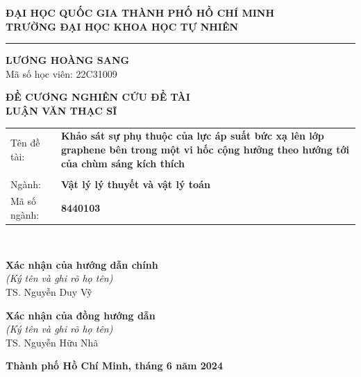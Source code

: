 \documentclass[a4paper]{elsarticle}
\begin{document}
\onehalfspacing
\fontsize{12}{15.6}\selectfont
\begin{titlepage}
		\begin{center}
\textbf{ĐẠI HỌC QUỐC GIA THÀNH PHỐ HỒ CHÍ MINH}\\
\textbf{TRƯỜNG ĐẠI HỌC KHOA HỌC TỰ NHIÊN}\\
	\noindent\rule{4cm}{0.4pt}
\end{center}
\vspace{10pt}
\fontsize{13}{15.6}\selectfont
\begin{center}
	\textbf{LƯƠNG HOÀNG SANG}\\
	Mã số học viên: 22C31009
\end{center}
\fontsize{16pt}{15.6pt}\selectfont
\vspace{20pt}
\begin{center}
	\textbf{ĐỀ CƯƠNG NGHIÊN CỨU ĐỀ TÀI\\ LUẬN VĂN THẠC SĨ
	}
\end{center}

\vspace{20pt}
\fontsize{12}{15.6}\selectfont
\begin{tabular}{p{3cm}p{11cm}}
	Tên đề tài: & \textbf{Khảo sát sự phụ thuộc của lực áp suất bức xạ lên lớp graphene bên trong một vi hốc cộng hưởng theo hướng tới của chùm sáng kích thích}\\
	&\\
	Ngành: & \textbf{Vật lý lý thuyết và vật lý toán}\\
	Mã số ngành: &\textbf{8440103}
\end{tabular}
\vspace{2cm}\\
\begin{minipage}{0.5\textwidth}
\begin{center}
	\textbf{Xác nhận của hướng dẫn chính}\\
	\textit{(Ký tên và ghi rõ họ tên)}\\
	\vspace{2.5cm}
	TS. Nguyễn Duy Vỹ
\end{center}
\end{minipage}
\hfill
\begin{minipage}{0.5\textwidth}
	\begin{center}
		\textbf{Xác nhận của đồng hướng dẫn}\\
		\textit{(Ký tên và ghi rõ họ tên)}\\
		\vspace{2.5cm}
		TS. Nguyễn Hữu Nhã
	\end{center}
\end{minipage}


\vspace{1cm}

\begin{center}
	\textbf{Thành phố Hồ Chí Minh, tháng 6 năm 2024}
\end{center}
\end{titlepage}
\newpage
\fontsize{13}{15.6}\selectfont
\end{document}
